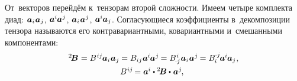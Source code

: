 \begin{otherlanguage}{russian}
От~векторов перейдём к~тензорам второй сложности. Имеем четыре комплекта диад:
${\bm{a}_i \hspace{0.1ex} \bm{a}_j}$,
\hbox{$\bm{a}^{\hspace{-0.05ex}i} \hspace{-0.1ex} \bm{a}^{\hspace{0.05ex}j}$\hspace{-0.25ex},}
\hbox{$\bm{a}_i \hspace{0.1ex} \bm{a}^{\hspace{0.05ex}j}$\hspace{-0.25ex},}
${\bm{a}^{\hspace{-0.05ex}i} \hspace{-0.1ex} \bm{a}_j}$.
Согласующиеся коэффициенты в~декомпозиции тензора называются его контра\-вариант\-ными, ко\-вариант\-ными и~смешан\-ными компонентами:
\vspace{0.1em}\begin{equation}\begin{array}{c}
{^2\!\bm{B}} \hspace{0.1ex} =
B^{\hspace{0.1ex}ij} \hspace{-0.1ex} \bm{a}_i \hspace{0.1ex} \bm{a}_j \hspace{-0.05ex} =
B_{ij} \hspace{0.1ex} \bm{a}^{\hspace{-0.05ex}i} \hspace{-0.1ex} \bm{a}^{\hspace{0.05ex}j} \hspace{-0.15ex} =
B_{\hspace{-0.2ex} \cdot j}^{\hspace{0.1ex}i} \hspace{0.1ex} \bm{a}_i \hspace{0.1ex} \bm{a}^{\hspace{0.05ex}j} \hspace{-0.15ex} =
B_{\hspace{-0.1ex}i}^{\hspace{-0.05ex} \cdot j} \hspace{-0.2ex} \bm{a}^{\hspace{-0.05ex}i} \hspace{-0.1ex} \bm{a}_j \hspace{0.1ex}, \\[0.4em]
%
B^{\hspace{0.1ex}ij} \hspace{-0.25ex} = \bm{a}^{\hspace{-0.05ex}i} \dotp {^2\!\bm{B}} \dotp \hspace{0.1ex} \bm{a}^{\hspace{0.05ex}j} \hspace{-0.2ex}, \:\,

\end{array}
\end{equation}
\end{otherlanguage}
